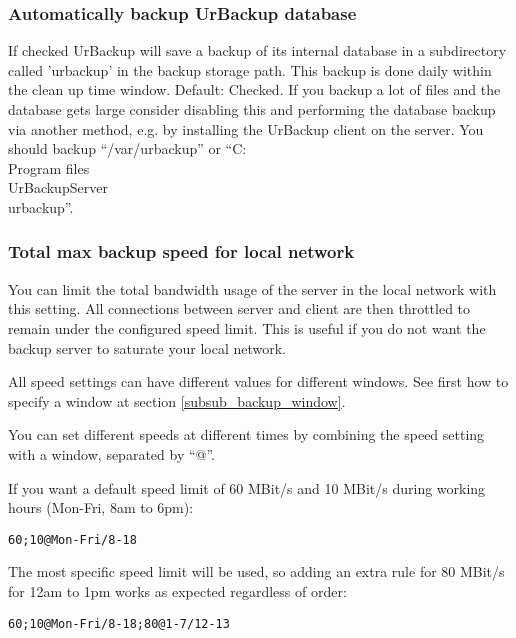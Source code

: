 \documentclass[a4paper,10pt]{article}
\begin{document}
\subsubsection{Automatically backup UrBackup database}

If checked UrBackup will save a backup of its internal database in a
subdirectory called 'urbackup' in the backup storage path. This backup is done
daily within the clean up time window. Default: Checked.
If you backup a lot of files and the database
gets large consider disabling this and performing the database backup via another method,
e.g. by installing the UrBackup client on the server. You should backup ``/var/urbackup''
or ``C:\\Program files\\UrBackupServer\\urbackup''.

\subsubsection{Total max backup speed for local network}

You can limit the total bandwidth usage of the server in the local network
with this setting. All connections between server and client are then throttled
to remain under the configured speed limit. This is useful if you do not want
the backup server to saturate your local network.

\label{speed_settings}
All speed settings can have different values for different windows. See first
how to specify a window at section \ref{subsub_backup_window}.

\par\null\par
You can set different speeds at different times by combining the speed setting with a window,
separated by ``@''.

\par\null\par
If you want a default speed limit of 60 MBit/s and 10 MBit/s during working hours (Mon-Fri, 8am to 6pm):
\begin{verbatim}
60;10@Mon-Fri/8-18
\end{verbatim}

The most specific speed limit will be used, so adding an extra rule for 80 MBit/s for 12am to 1pm works as expected regardless of order:
\begin{verbatim}
60;10@Mon-Fri/8-18;80@1-7/12-13
\end{verbatim}
 
\end{document}

